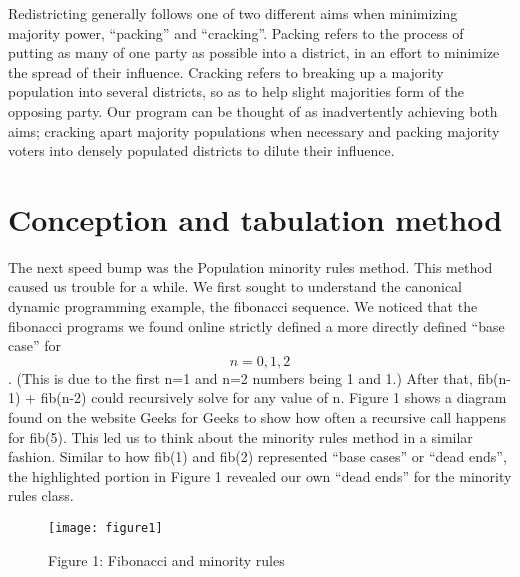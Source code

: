 \documentclass{article}
\begin{document}
\hspace{\parindent}
Redistricting generally follows one of two different aims when minimizing majority power, “packing” and “cracking”. Packing refers to the process of putting as many of one party as possible into a district, in an effort to minimize the spread of their influence. Cracking refers to breaking up a majority population into several districts, so as to help slight majorities form of the opposing party. Our program can be thought of as inadvertently achieving both aims; cracking apart majority populations when necessary and packing majority voters into densely populated districts to dilute their influence.

\section{Conception and tabulation method}
\hspace{\parindent}
The next speed bump was the Population minority rules method. This method caused us trouble for a while. We first sought to understand the canonical dynamic programming example, the fibonacci sequence. We noticed that the fibonacci programs we found online strictly defined a more directly defined “base case” for\[ n=0,1,2\]. (This is due to the first  n=1 and n=2  numbers being 1 and 1.) After that, fib(n-1) + fib(n-2) could recursively solve for any value of n. Figure 1 shows a diagram found on the website Geeks for Geeks to show how often a recursive call happens for fib(5). This led us to think about the minority rules method in a similar fashion. Similar to how fib(1) and fib(2) represented “base cases” or “dead ends”, the highlighted portion in Figure 1 revealed our own “dead ends” for the minority rules class.


\begin{figure}[ht]
  \texttt{[image: figure1]}
  \centering
  \caption{Figure 1: Fibonacci and minority rules }
  \label{fig:apollo}
\end{figure}
\end{document}

